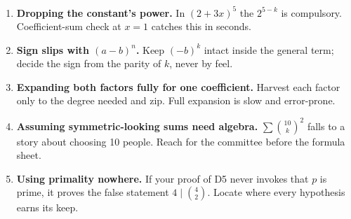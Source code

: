 \documentclass[11pt,a4paper]{article}
\begin{document}
\begin{enumerate}[leftmargin=2em, itemsep=4pt]
  \item \textbf{Dropping the constant's power.} In $(2+3x)^5$ the $2^{5-k}$ is compulsory. Coefficient-sum check at $x=1$ catches this in seconds. 
  \item \textbf{Sign slips with $(a-b)^n$.} Keep $(-b)^k$ intact inside the general term; decide the sign from the parity of $k$, never by feel. 
  \item \textbf{Expanding both factors fully for one coefficient.} Harvest each factor only to the degree needed and zip. Full expansion is slow and error-prone. 
  \item \textbf{Assuming symmetric-looking sums need algebra.} $\sum\binom{10}{k}^2$ falls to a story about choosing 10 people. Reach for the committee before the formula sheet. 
  \item \textbf{Using primality nowhere.} If your proof of D5 never invokes that $p$ is prime, it proves the false statement $4\mid\binom{4}{2}$. Locate where every hypothesis earns its keep. 
\end{enumerate}

\end{document}
